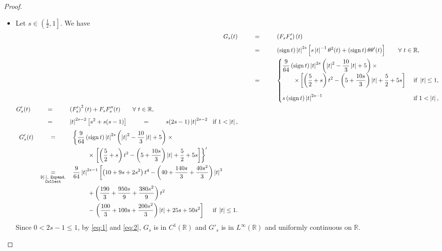 \documentclass[11pt, a4paper]{article}
\numberwithin{equation}{section}
\newcommand{\coex}[2][\hphantom{longexplanation}]{%
  \underset{{#1}}{\overset{\hphantom{longexplanation}}{#2}}
}
\newcommand{\RR}{{\mathbb R}}
\newcommand{\abs}[1]{\left\lvert #1\right\rvert}
\DeclareMathOperator{\sign}{{sign}}
\begin{document}
\begin{proof}
\begin{itemize}[wide]
\item[$(ii)$] Let $s\in \left(\frac{1}{2},1 \right]$. We have
  \begin{subequations}
    \label{eq:2}
    \begin{align}
      G_{s}(t)
      &\coex{=} \left(F_{s}F_{s}' \right)(t)\\
      &\coex{=} \left( \sign t \right)
        \abs{t}^{2s} \left[s \abs{t}^{-1}\theta^{2}(t) + \left( \sign
        t \right) \theta\theta'(t) \right]\qquad\forall~t\in\RR,\\
      &\coex{=}
        \begin{cases} \displaystyle
\frac{9}{64} \left( \sign t \right) \abs{t}^{2s}
          \left(\abs{t}^{2}-\frac{10}{3}\abs{t} +5 \right)\times\\
          \qquad \displaystyle \times \left[ \left(\frac{5}{2} + s \right) t^2 - \left(5 + \frac{10s}{3} \right)\abs{t} + \frac{5}{2} + 5s  \right]
          &\text{ if } \abs{t} \le 1,\vspace{1em}\\
          s \left( \sign t \right) \abs{t}^{2s-1} & \text{ if } 1 <\abs{t},
        \end{cases}\\
      \begin{split}
        G_{s}'(t)
      &\coex{=} \left(F_{s}'
        \right)^{2}(t)+F_{s}F_{s}''(t)\qquad\forall~t\in\RR,\\
      &\coex{=} \abs{t}^{2s-2} \left[s^{2}+s(s-1) \right]
      \coex{=} s(2s-1)\abs{t}^{2s-2}~ \text{ if } 1 < \abs{t},
      \end{split}
      \label{fs12z}\\
      \begin{split}
        G_{s}'(t)
        &\coex{=}
          \left\{\frac{9}{64} \left( \sign t \right) \abs{t}^{2s}
          \left(\abs{t}^{2}-\frac{10}{3}\abs{t} +5 \right)
          \right. \times \\
        &\coex{~} \qquad \quad \times \left.\left[ \left(\frac{5}{2} +
          s \right) t^2 - \left(5 + \frac{10s}{3} \right)\abs{t} +
          \frac{5}{2} + 5s  \right]\right\}'\\
        &\coex[\substack{\mathtt{D[\cdot]},~\mathtt{Expand},\\
        \mathtt{Collect}}]{=}
        \frac{9}{64} \abs{t}^{2 s -1} \left[\left(10 + 9 s + 2 s^2
        \right) t^4 - \left(40 + \frac{140 s}{3} + \frac{40
        s^2}{3} \right)\abs{t}^3\right.\\
        &\coex{~} \qquad \quad
          + \left(\frac{190}{3} + \frac{950 s}{9}+ \frac{380 s^2}{9} \right)t^2\\
        &\coex{~} \qquad \quad
          -\left.
          \left(\frac{100}{3} + 100 s + \frac{200 s^2}{3} \right)\abs{t} +
          25 s + 50 s^2\right]\quad \text{ if } \abs{t}\le 1.
      \end{split}\label{fs12zb}
    \end{align}
  \end{subequations}
Since $0<2s-1\le 1$, by \eqref{eq:1} and \eqref{eq:2}, $G_{s}$ is in
$C^{1}(\RR)$ and $G'_{s}$ is  in $L^{\infty}(\RR)$ and uniformly
continuous on $\RR$.
\end{itemize}
\end{proof}
\end{document}

